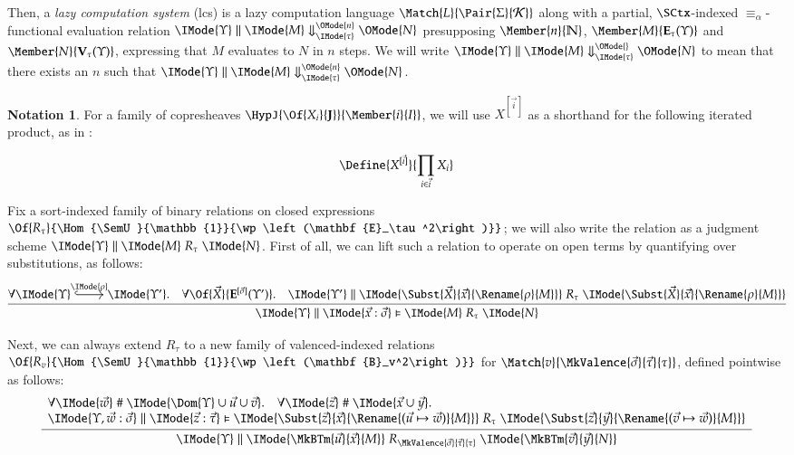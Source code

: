 \documentclass[11pt]{article}
\theoremstyle{definition}
\theoremstyle{notation}
\newtheorem*{notation*}{Notation}
\theoremstyle{remark}
\numberwithin{equation}{section}
\newcommand\Pow[1]{\wp\left(#1\right)}
\newcommand\EvalN[5]{\IMode{#1}\parallel\IMode{#4}\Downarrow^{\OMode{#3}}_{\IMode{#2}}\OMode{#5}}
\newcommand\Eval[4]{\EvalN{#1}{#2}{}{#3}{#4}}
\newcommand\Exprs{\mathbf{E}}
\newcommand\Values{\mathbf{V}}
\newcommand\BTms{\mathbf{B}}
\newcommand\Naturals{\mathbb{N}}
\begin{document}
Then, a \emph{lazy computation system} (lcs) is a lazy computation language
$\Match{L}{\Pair{\Sigma}{\CanOperators}}$ along with a partial, $\SCtx$-indexed
$\equiv_\alpha$-functional evaluation relation
$\EvalN{\Upsilon}{\tau}{n}{M}{N}$ presupposing $\Member{n}{\Naturals}$,
$\Member{M}{\Exprs_\tau(\Upsilon)}$ and $\Member{N}{\Values_\tau(\Upsilon)}$,
expressing that $M$ evaluates to $N$ in $n$ steps.  We will write
$\Eval{\Upsilon}{\tau}{M}{N}$ to mean that there exists an $n$ such that
$\EvalN{\Upsilon}{\tau}{n}{M}{N}$.

\newcommand\PBinRel[4]{\IMode{#2}\parallel\IMode{#3}\mathrel{#1}\IMode{#4}}
\newcommand\HPBinRel[5]{\IMode{#2}\parallel\IMode{#3}\vDash\IMode{#4}\mathrel{#1}\IMode{#5}}

\begin{notation*}
  For a family of copresheaves $\HypJ{\Of{X_i}{\SemU}}{\Member{i}{I}}$, we will
  use $X^{[\vec{i}]}$ as a shorthand for the following iterated product, as
  in \cite{sterling-morrison:2015}:

  \[
    \Define{
      X^{[\vec{i}]}
    }{
      \prod_{i\in\vec{i}}
        X_i
    }
  \]
\end{notation*}

Fix a sort-indexed family of binary relations on closed expressions
$\Of{R_\tau}{\Hom{\SemU}{\mathbb{1}}{\Pow{\Exprs_\tau^2}}}$; we will
also write the relation as a judgment scheme
$\PBinRel{R_\tau}{\Upsilon}{M}{N}$. First of all, we can lift such a relation
to operate on open terms by quantifying over substitutions, as follows:
\[
  \infer{
    \HPBinRel{R_\tau}{\Upsilon}{\vec{x}:\vec{\sigma}}{M}{N}
  }{
    \forall
      \begin{tikzcd}[cramped, ampersand replacement = \&]
         \IMode{\Upsilon} \arrow[r,hook,"\IMode{\rho}"] \&\IMode{\Upsilon'}
      \end{tikzcd}.
    \quad
    \forall \Of{\vec{X}}{\Exprs^{[\vec{\sigma}]}(\Upsilon')}.
    \quad
    \PBinRel{R_\tau}{\Upsilon'}{
      \Subst{\vec{X}}{\vec{x}}{\Rename{\rho}{M}}
    }{
      \Subst{\vec{X}}{\vec{x}}{\Rename{\rho}{M}}
    }
  }
\]

Next, we can always extend $R_\tau$ to a new
family of valenced-indexed relations
$\Of{R_v}{\Hom{\SemU}{\mathbb{1}}{\Pow{\BTms_v^2}}}$ for
$\Match{v}{\MkValence{\vec{\sigma}}{\vec{\tau}}{\tau}}$, defined pointwise as
follows:
\[
  \infer{
    \PBinRel{R_{\MkValence{\vec{\sigma}}{\vec{\tau}}{\tau}}}{\Upsilon}{
      \MkBTm{\vec{u}}{\vec{x}}{M}
    }{
      \MkBTm{\vec{v}}{\vec{y}}{N}
    }
  }{
    \begin{array}{l}
      \forall\IMode{\vec{w}}\mathrel{\#}\IMode{\Dom{\Upsilon}\cup\vec{u}\cup\vec{v}}.\quad
      \forall\IMode{\vec{z}}\mathrel{\#}\IMode{\vec{x}\cup\vec{y}}.\\
      \HPBinRel{R_\tau}{\Upsilon,\vec{w}:\vec{\sigma}}{\vec{z}:\vec{\tau}}{
        \Subst{\vec{z}}{\vec{x}}{
          \Rename{(\vec{u}\mapsto\vec{w})}{M}
        }
      }{
        \Subst{\vec{z}}{\vec{y}}{
          \Rename{(\vec{v}\mapsto\vec{w})}{M}
        }
      }
    \end{array}
  }
\]
\end{document}
